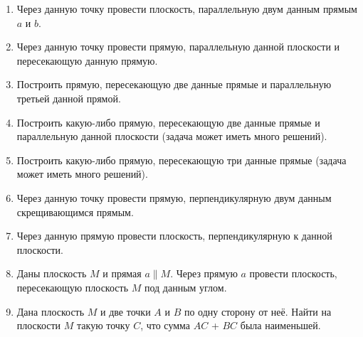 
\begin{enumerate}[resume]
\item
Через данную точку провести плоскость, параллельную двум данным прямым $a$ и $b$.

\item
Через данную точку провести прямую, параллельную данной плоскости и пересекающую данную прямую.

\item
Построить прямую, пересекающую две данные прямые и параллельную третьей данной прямой.

\item
Построить какую-либо прямую, пересекающую две данные прямые и параллельную данной плоскости (задача может иметь много решений).

\item
Построить какую-либо прямую, пересекающую три данные прямые (задача может иметь много решений).

\item
Через данную точку провести прямую, перпендикулярную двум данным скрещивающимся прямым.

\item
Через данную прямую провести плоскость, перпендикулярную к данной плоскости.

\item
Даны плоскость $M$ и прямая $a\parallel M$.
Через прямую $a$ провести плоскость, пересекающую плоскость $M$ под данным углом.

\item
Дана плоскость $M$ и две точки $A$ и $B$ по одну сторону от неё.
Найти на плоскости $M$ такую точку $C$, что сумма $AC$ + $BC$ была наименьшей.

\end{enumerate}




